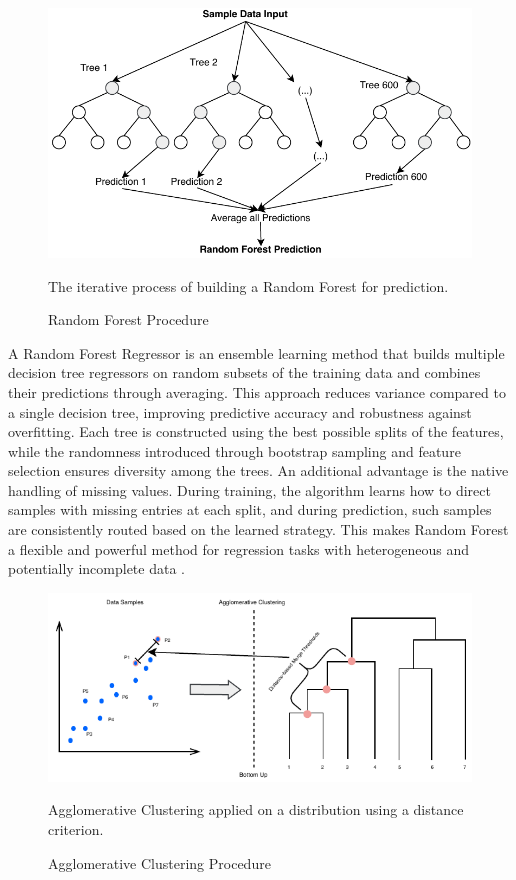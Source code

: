 \label{sec:background_ml_rfr}
\begin{figure}[H]
    \centering
    \includegraphics[scale=0.7]{fig/02/02-rf.pdf}
    \caption{Random Forest Procedure}
    \label{fig:02-rf}
    \tiny
    The iterative process of building a Random Forest for prediction.
\end{figure}

A Random Forest Regressor is an ensemble learning method that builds multiple decision tree regressors on random subsets of the training data and combines their predictions through averaging. This approach reduces variance compared to a single decision tree, improving predictive accuracy and robustness against overfitting. Each tree is constructed using the best possible splits of the features, while the randomness introduced through bootstrap sampling and feature selection ensures diversity among the trees. An additional advantage is the native handling of missing values. During training, the algorithm learns how to direct samples with missing entries at each split, and during prediction, such samples are consistently routed based on the learned strategy. This makes Random Forest a flexible and powerful method for regression tasks with heterogeneous and potentially incomplete data \cite{Breiman2001RandomF}.

\label{sec:background_ml_ac}

\begin{figure}[H]
    \centering
    \includegraphics{fig/02/02-clustering.pdf}
    \caption{Agglomerative Clustering Procedure}
    \label{fig:02-clustering}
    \tiny
    Agglomerative Clustering applied on a distribution using a distance criterion.
\end{figure}

